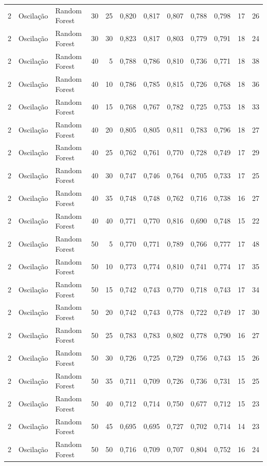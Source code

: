 \begin{longtable}{@{}rllrrrrrrrrr@{}}
2 & Oscilação & Random Forest & 30 & 25 & 0,820 & 0,817 & 0,807 & 0,788 & 0,798 & 17 & 26 \\
2 & Oscilação & Random Forest & 30 & 30 & 0,823 & 0,817 & 0,803 & 0,779 & 0,791 & 18 & 24 \\
2 & Oscilação & Random Forest & 40 & 5 & 0,788 & 0,786 & 0,810 & 0,736 & 0,771 & 18 & 38 \\
2 & Oscilação & Random Forest & 40 & 10 & 0,786 & 0,785 & 0,815 & 0,726 & 0,768 & 18 & 36 \\
2 & Oscilação & Random Forest & 40 & 15 & 0,768 & 0,767 & 0,782 & 0,725 & 0,753 & 18 & 33 \\
2 & Oscilação & Random Forest & 40 & 20 & 0,805 & 0,805 & 0,811 & 0,783 & 0,796 & 18 & 27 \\
2 & Oscilação & Random Forest & 40 & 25 & 0,762 & 0,761 & 0,770 & 0,728 & 0,749 & 17 & 29 \\
2 & Oscilação & Random Forest & 40 & 30 & 0,747 & 0,746 & 0,764 & 0,705 & 0,733 & 17 & 25 \\
2 & Oscilação & Random Forest & 40 & 35 & 0,748 & 0,748 & 0,762 & 0,716 & 0,738 & 16 & 27 \\
2 & Oscilação & Random Forest & 40 & 40 & 0,771 & 0,770 & 0,816 & 0,690 & 0,748 & 15 & 22 \\
2 & Oscilação & Random Forest & 50 & 5 & 0,770 & 0,771 & 0,789 & 0,766 & 0,777 & 17 & 48 \\
2 & Oscilação & Random Forest & 50 & 10 & 0,773 & 0,774 & 0,810 & 0,741 & 0,774 & 17 & 35 \\
2 & Oscilação & Random Forest & 50 & 15 & 0,742 & 0,743 & 0,770 & 0,718 & 0,743 & 17 & 34 \\
2 & Oscilação & Random Forest & 50 & 20 & 0,742 & 0,743 & 0,778 & 0,722 & 0,749 & 17 & 30 \\
2 & Oscilação & Random Forest & 50 & 25 & 0,783 & 0,783 & 0,802 & 0,778 & 0,790 & 16 & 27 \\
2 & Oscilação & Random Forest & 50 & 30 & 0,726 & 0,725 & 0,729 & 0,756 & 0,743 & 15 & 26 \\
2 & Oscilação & Random Forest & 50 & 35 & 0,711 & 0,709 & 0,726 & 0,736 & 0,731 & 15 & 25 \\
2 & Oscilação & Random Forest & 50 & 40 & 0,712 & 0,714 & 0,750 & 0,677 & 0,712 & 15 & 23 \\
2 & Oscilação & Random Forest & 50 & 45 & 0,695 & 0,695 & 0,727 & 0,702 & 0,714 & 14 & 23 \\
2 & Oscilação & Random Forest & 50 & 50 & 0,716 & 0,709 & 0,707 & 0,804 & 0,752 & 16 & 24 \\

\end{longtable}
